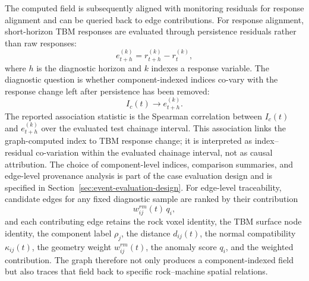 The computed field is subsequently aligned with monitoring residuals for
response alignment and can be queried back to edge contributions. For response
alignment, short-horizon TBM responses are evaluated through persistence
residuals rather than raw responses:
\[
e_{t+h}^{(k)} = r_{t+h}^{(k)}-r_t^{(k)},
\]
where $h$ is the diagnostic horizon and $k$ indexes a response variable. The
diagnostic question is whether component-indexed indices co-vary with
the response change left after persistence has been removed:
\[
I_c(t)\rightarrow e_{t+h}^{(k)} .
\]
The reported association statistic is the Spearman correlation between
$I_c(t)$ and $e_{t+h}^{(k)}$ over the evaluated test chainage interval. This
association links the graph-computed index to TBM response change; it is
interpreted as index--residual co-variation within the evaluated chainage
interval, not as causal attribution. The choice of component-level indices, comparison summaries,
and edge-level provenance analysis is part of the case evaluation
design and is specified in Section~\ref{sec:event-evaluation-design}.
For edge-level traceability, candidate edges for any fixed diagnostic sample
are ranked by their contribution
\[
w_{ij}^{rm}(t)\,q_i,
\]
and each contributing edge retains the rock voxel identity, the TBM surface
node identity, the component label $\rho_j$, the distance $d_{ij}(t)$, the
normal compatibility $\kappa_{ij}(t)$, the geometry weight $w_{ij}^{rm}(t)$,
the anomaly score $q_i$, and the weighted contribution. The graph therefore
not only produces a component-indexed field but also traces that field back to
specific rock--machine spatial relations.

\FloatBarrier
